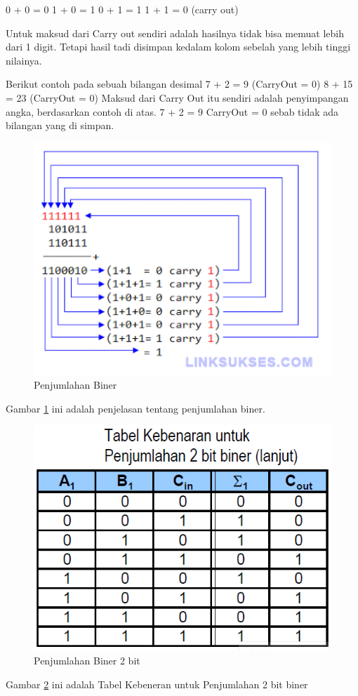 	0 + 0 = 0
	1 + 0 = 1
	0 + 1 = 1
	1 + 1 = 0 (carry out) 

	Untuk maksud dari Carry out sendiri adalah hasilnya tidak bisa memuat lebih dari 1 digit. Tetapi  hasil tadi disimpan kedalam kolom sebelah yang lebih tinggi nilainya.

	Berikut contoh pada sebuah bilangan desimal
	7 + 2 = 9 (CarryOut = 0)
	8 + 15 = 23 (CarryOut = 0)
	Maksud dari Carry Out itu sendiri adalah penyimpangan angka, berdasarkan contoh di atas. 7 + 2 = 9 CarryOut = 0 sebab tidak ada bilangan yang di simpan. 

		\begin{figure} [ht]
		\centerline{\includegraphics[width=1\textwidth]{figures/Penjumlahan-Biner.gif}}
		\caption{Penjumlahan Biner}
		\label{Penjumlahan-Biner}
		\end{figure}
	Gambar \ref{Penjumlahan-Biner} ini adalah penjelasan tentang penjumlahan biner.

		\begin{figure} [ht]
		\centerline{\includegraphics[width=1\textwidth]{figures/Biner2angka.png}}
		\caption{Penjumlahan Biner 2 bit}
		\label{Biner2angka}
		\end{figure}
	Gambar \ref{Biner2angka} ini adalah Tabel Kebeneran untuk Penjumlahan 2 bit biner

